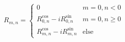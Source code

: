 \documentclass[a4paper, 12pt]{article}
\begin{document}
\begin{equation*}
R_{m,n} = \begin{cases}
            0                                             & m=0, n<0 \\
            R_{0,n}^\mathrm{cos} - i R_{0,n}^\mathrm{sin} & m=0,n \geq 0 \\
            R_{m,n}^\mathrm{cos} - i R_{m,n}^\mathrm{sin} & \textrm{else}
          \end{cases}
\end{equation*}
\end{document}
